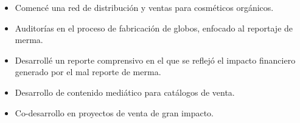 \documentclass[10pt,a4paper,ragged2e]{altacv}
\begin{document}
\begin{itemize}
\item Comenc\'e una red de distribuci\'on y ventas para cosm\'eticos org\'anicos.
\end{itemize}
\divider

\begin{itemize}
\item Auditor\'ias en el proceso de fabricaci\'on de globos, enfocado al reportaje de merma.
\item Desarroll\'e un reporte comprensivo en el que se reflej\'o el impacto financiero generado por el mal reporte de merma.
\end{itemize}
\divider

\begin{itemize}
\item Desarrollo de contenido medi\'atico para cat\'alogos de venta.
\item Co-desarrollo en proyectos de venta de gran impacto.
\end{itemize}
\divider

\clearpage
\end{document}
